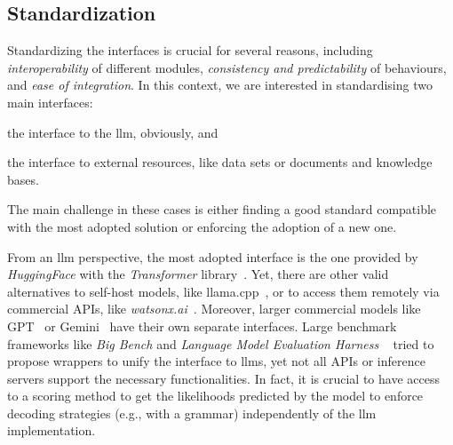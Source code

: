 \documentclass[manuscript,screen]{acmart}
\begin{document}
\subsection{Standardization}
\label{sec:standardisation}


Standardizing the interfaces is crucial for several reasons, including \emph{interoperability} of different modules, \emph{consistency and predictability} of behaviours, and \emph{ease of integration}.
In this context, we are interested in standardising two main interfaces:
\begin{enumerate*}[label=(\arabic*)]
    \item the interface to the \ac{llm}, obviously, and
    \item the interface to external resources, like data sets or documents and knowledge bases.
\end{enumerate*}
The main challenge in these cases is either finding a good standard compatible with the most adopted solution or enforcing the adoption of a new one.


From an \ac{llm} perspective, the most adopted interface is the one provided by \emph{HuggingFace} with the \emph{Transformer} library~\cite{DBLP:conf/emnlp/WolfDSCDMCRLFDS20}.
Yet, there are other valid alternatives to self-host models, like llama.cpp~\cite{llama.cpp}, or to access them remotely via commercial APIs, like \emph{watsonx.ai}~\cite{https://www.ibm.com/products/watsonx-ai}.
Moreover, larger commercial models like GPT~\cite{https://platform.openai.com/docs/api-reference/} or Gemini~\cite{https://ai.google.dev/} have their own separate interfaces.
Large benchmark frameworks like \emph{Big Bench} and \emph{Language Model Evaluation Harness
}~\cite{lintang_sutawika_2024_14506035} tried to propose wrappers to unify the interface to \acp{llm}, yet not all APIs or inference servers support the necessary functionalities.
In fact, it is crucial to have access to a scoring method to get the likelihoods predicted by the model to enforce decoding strategies (e.g., with a grammar) independently of the \ac{llm} implementation.
\end{document}
